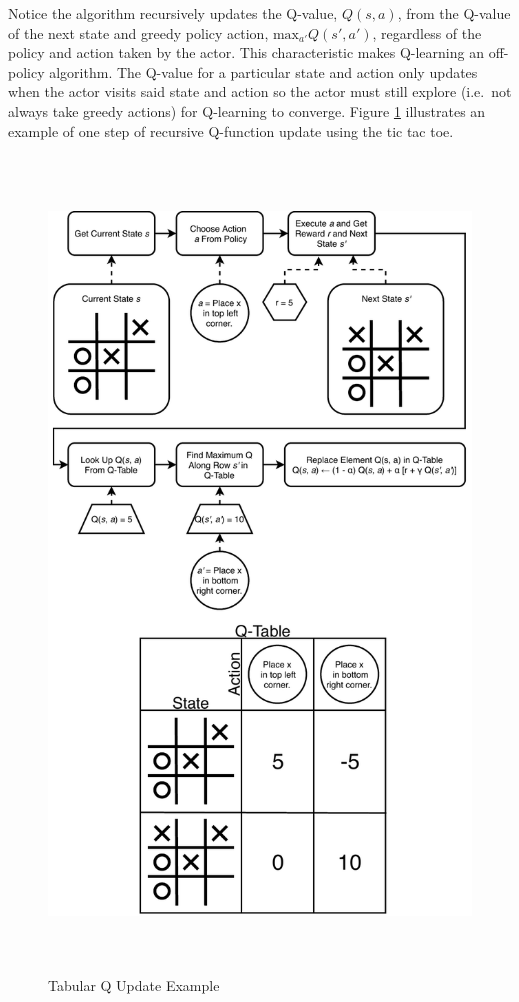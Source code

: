Notice the algorithm recursively updates the Q-value, $Q(s,a)$, from the Q-value of the next state and greedy policy action, $\text{max}_{a'}Q(s',a')$, regardless of the policy and action taken by the actor. This characteristic makes Q-learning an off-policy algorithm. The Q-value for a particular state and action only updates when the actor visits said state and action so the actor must still explore (i.e.\ not always take greedy actions) for Q-learning to converge. Figure \ref{fig:q_learning_ex} illustrates an example of one step of recursive Q-function update using the tic tac toe. 
\begin{figure}   %
	\centering \includegraphics[width=6in, height=8.5in, keepaspectratio]{figures/q_learning_ex.pdf}
	\caption{Tabular Q Update Example}\label{fig:q_learning_ex}
\end{figure}

